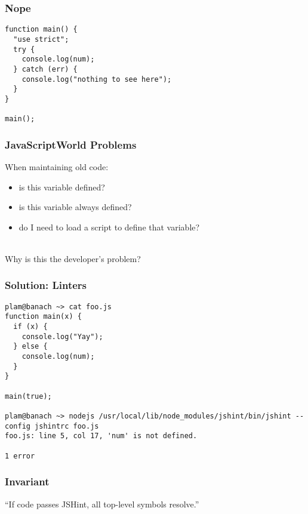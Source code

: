 \documentclass{beamer}
\newenvironment{changemargin}[1]{%
  \begin{list}{}{%
    \setlength{\topsep}{0pt}%
    \setlength{\leftmargin}{#1}%
    \setlength{\rightmargin}{1em}
    \setlength{\listparindent}{\parindent}%
    \setlength{\itemindent}{\parindent}%
    \setlength{\parsep}{\parskip}%
  }%
  \item[]}{\end{list}}
\begin{document}
\begin{frame}[fragile]
\frametitle{Nope}
\begin{changemargin}{2cm}
\begin{lstlisting}
function main() {
  "use strict";
  try {
    console.log(num);
  } catch (err) {
    console.log("nothing to see here");
  }
}

main();
\end{lstlisting}
\end{changemargin}
\end{frame}

\begin{frame}
\frametitle{JavaScriptWorld Problems}
\begin{changemargin}{2cm}
When maintaining old code:
\begin{itemize}
\item is this variable defined?
\item is this variable always defined?
\item do I need to load a script to define that variable?
\end{itemize}
~\\[1em]
Why is this the developer's problem?
\end{changemargin}
\end{frame}


\begin{frame}[fragile]
\frametitle{Solution: Linters}
\begin{changemargin}{0cm}

\begin{lstlisting}
plam@banach ~> cat foo.js
function main(x) {
  if (x) {
    console.log("Yay");
  } else {
    console.log(num);
  }
}

main(true);

plam@banach ~> nodejs /usr/local/lib/node_modules/jshint/bin/jshint --config jshintrc foo.js
foo.js: line 5, col 17, 'num' is not defined.

1 error
\end{lstlisting}
\end{changemargin}
\end{frame}

\begin{frame}
\frametitle{Invariant}

\begin{center}
``If code passes JSHint, all top-level symbols resolve.''
\end{center}
\end{frame}
\end{document}
